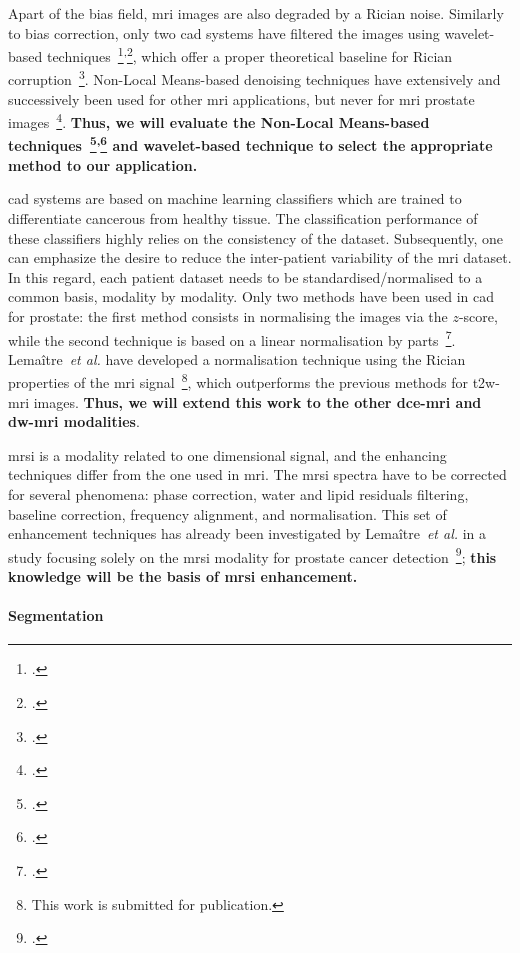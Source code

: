 Apart of the bias field, \Ac{mri} images are also degraded by a Rician noise. 
Similarly to bias correction, only two \ac{cad} systems have filtered the images using wavelet-based techniques~\footcite{Mallat2008}\textsuperscript{,}\footcite{Pizurica2003}, which offer a proper theoretical baseline for Rician corruption~\footcite{Nowak1999}.
Non-Local Means-based denoising techniques have extensively and successively been used for other \ac{mri} applications, but never for \ac{mri} prostate images~\footcite{Manjon2008}.
\textbf{Thus, we will evaluate the Non-Local Means-based techniques~\footcite{Manjon2012}\textsuperscript{,}\footcite{Coupe2011} and wavelet-based technique to select the appropriate method to our application.}

\ac{cad} systems are based on machine learning classifiers which are trained to differentiate cancerous from healthy tissue.
The classification performance of these classifiers highly relies on the consistency of the dataset.
Subsequently, one can emphasize the desire to reduce the inter-patient variability of the \ac{mri} dataset.
In this regard, each patient dataset needs to be standardised/normalised to a common basis, modality by modality.
Only two methods have been used in \ac{cad} for prostate: the first method consists in normalising the images via the $z$-score, while the second technique is based on a linear normalisation by parts~\footcite{Madabhushi2006a}.
Lema\^itre~\emph{et al.} have developed a normalisation technique using the Rician properties of the \ac{mri} signal~\footnote{This work is submitted for publication.}, which outperforms the previous methods for \ac{t2w}-\ac{mri} images.
\textbf{Thus, we will extend this work to the other \ac{dce}-\ac{mri} and \ac{dw}-\ac{mri} modalities}.

\ac{mrsi} is a modality related to one dimensional signal, and the enhancing techniques differ from the one used in \ac{mri}.
The \ac{mrsi} spectra have to be corrected for several phenomena: phase correction, water and lipid residuals filtering, baseline correction, frequency alignment, and normalisation.
This set of enhancement techniques has already been investigated by Lema\^itre~\emph{et al.} in a study focusing solely on the \ac{mrsi} modality for prostate cancer detection~\footcite{Lemaitre2011}; \textbf{this knowledge will be the basis of \ac{mrsi} enhancement.}

\paragraph{Segmentation}

